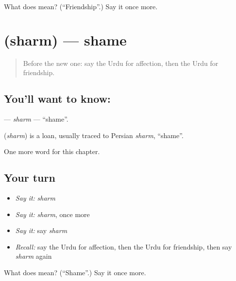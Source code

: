 \begin{tcolorbox}[breakable,colback=teal!4,colframe=teal!35!black,title={Before you move on}]
What does  mean? (\textquotedblleft{}Friendship\textquotedblright{}.) Say it once more.
\end{tcolorbox}
\section[\texorpdfstring{\ur{شرم} (sharm)}{شرم (sharm)}]{ (sharm) — shame}

\label{lesson:UR-C257-sharm}



\begin{quote}
Before the new one: say the Urdu for affection, then the Urdu for friendship.
\end{quote}

\subsection*{You'll want to know: }
\textbf{} — \emph{sharm} — \textquotedblleft{}shame\textquotedblright{}.

\begin{cousinweb}
\textbf{} (\emph{sharm}) is a loan, usually traced to Persian \emph{sharm}, \textquotedblleft{}shame\textquotedblright{}.
\end{cousinweb}

\begin{grammarlens}[title={What you've built}]
One more word for this chapter.
\end{grammarlens}

\subsection*{Your turn}
\begin{itemize}
\raggedright
  \item \emph{Say it:} \emph{sharm}
  \item \emph{Say it:} \emph{sharm}, once more
  \item \emph{Say it:} say \emph{sharm}
  \item \emph{Recall:} say the Urdu for affection, then the Urdu for friendship, then say \emph{sharm} again
\end{itemize}

\begin{tcolorbox}[breakable,colback=teal!4,colframe=teal!35!black,title={Before you move on}]
What does  mean? (\textquotedblleft{}Shame\textquotedblright{}.) Say it once more.
\end{tcolorbox}
